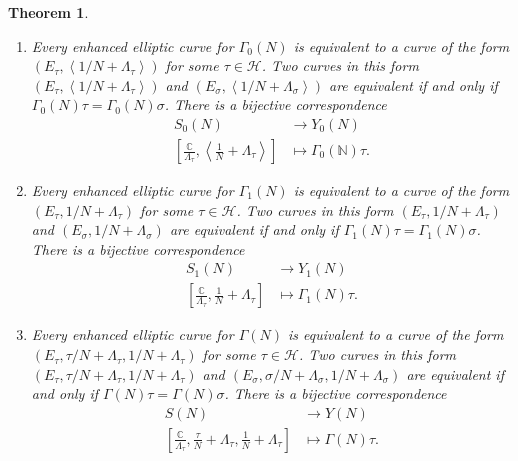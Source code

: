 \documentclass[titlepage,a4paper]{article}
\theoremstyle{theoremdd}
\newtheorem{theorem}{Theorem}[section]
\theoremstyle{definitiondd}
\theoremstyle{remarkdd}
\newcommand{\N}{\mathbb{N}}
\newcommand{\C}{\mathbb{C}}
\begin{document}
\begin{theorem}\label{thm:correspondence_modulispaces}
	\hspace{\linewidth}
	\begin{enumerate}
		\item Every enhanced elliptic curve for $\Gamma_0(N)$ is equivalent to a curve of the form $(E_\tau, \left<1 / N + \Lambda_\tau \right>)$ for some $\tau \in \mathcal{H} $. 
			Two curves in this form $(E_\tau, \left<1 / N + \Lambda_\tau \right>)$ and $(E_\sigma, \left<1 / N + \Lambda_\sigma \right>)$ are equivalent if and only if $\Gamma_0\left( N \right) \tau = \Gamma_0(N) \sigma$. There is a bijective correspondence
			\begin{align*}
				S_0(N) &\longrightarrow Y_0(N) \\
				\left[\frac{\C}{\Lambda_\tau}, \left<\frac{1}{N} + \Lambda_\tau \right>\right] &\longmapsto \Gamma_0(\N)\tau
			.\end{align*}
	
		\item Every enhanced elliptic curve for $\Gamma_1(N)$ is equivalent to a curve of the form $(E_\tau, 1 / N + \Lambda_\tau )$ for some $\tau \in \mathcal{H} $. 
			Two curves in this form $(E_\tau, 1 / N + \Lambda_\tau )$ and $(E_\sigma, 1 / N + \Lambda_\sigma)$ are equivalent if and only if $\Gamma_1\left( N \right) \tau = \Gamma_1(N) \sigma$. There is a bijective correspondence
			\begin{align*}
				S_1(N) &\longrightarrow Y_1(N) \\
				\left[\frac{\C}{\Lambda_\tau}, \frac{1}{N} + \Lambda_\tau \right] &\longmapsto \Gamma_1(N)\tau
			.\end{align*}
		\item Every enhanced elliptic curve for $\Gamma(N)$ is equivalent to a curve of the form $(E_\tau, \tau / N + \Lambda_\tau, 1 / N + \Lambda_\tau )$ for some $\tau \in \mathcal{H} $. 
			Two curves in this form $(E_\tau, \tau / N + \Lambda_\tau,  1 / N + \Lambda_\tau )$ and $(E_\sigma, \sigma / N + \Lambda_\sigma,1 / N + \Lambda_\sigma)$ are equivalent if and only if $\Gamma\left( N \right) \tau = \Gamma(N) \sigma$. There is a bijective correspondence
			\begin{align*}
				S(N) &\longrightarrow Y(N) \\
				\left[\frac{\C}{\Lambda_\tau}, \frac{\tau}{N} + \Lambda_\tau, \frac{1}{N} + \Lambda_\tau \right] &\longmapsto \Gamma(N)\tau
			.\end{align*}
	\end{enumerate}
\end{theorem}
\end{document}
